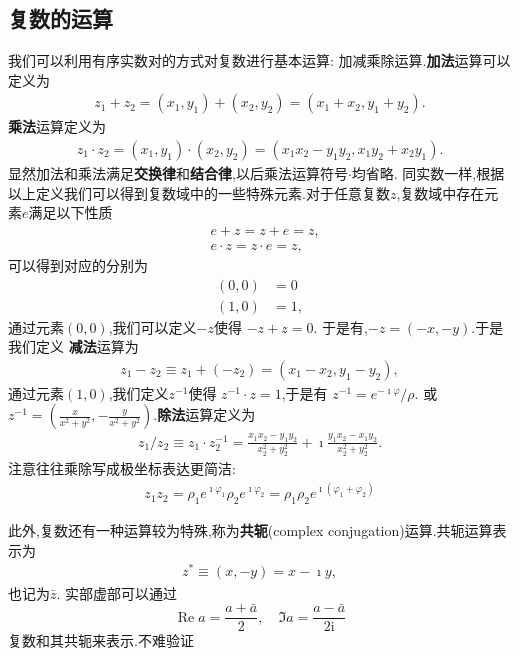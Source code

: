 \subsection{复数的运算}
我们可以利用有序实数对的方式对复数进行基本运算: 加减乘除运算.{\bf 加法}运算可以定义为
\begin{align}
    z_1 + z_2 = (x_1, y_1) + (x_2, y_2) = (x_1 + x_2, y_1 + y_2) .
\end{align}
{\bf 乘法}运算定义为
\begin{align}
    z_1 \cdot z_2 = (x_1, y_1) \cdot (x_2, y_2) = (x_1 x_2 - y_1 y_2, x_1 y_2 + x_2 y_1) .
\end{align}
显然加法和乘法满足{\bf 交换律}和{\bf 结合律},以后乘法运算符号$\cdot$均省略.
同实数一样,根据以上定义我们可以得到复数域中的一些特殊元素.对于任意复数$z$,复数域中存在元素$e$满足以下性质
\begin{align}
    & e + z = z + e = z ,\\ 
    & e \cdot z = z \cdot e = z , 
\end{align}
可以得到对应的分别为
\begin{align}
    (0, 0) &= 0\\
    (1, 0) &= 1 ,
\end{align}
通过元素$(0,0)$,我们可以定义$-z$使得 $-z + z = 0$. 于是有,$- z = (-x, -y)$.于是我们定义
{\bf 减法}运算为 
\begin{align}
    z_1 - z_2 \equiv z_1 + (-z_2) = (x_1 - x_2, y_1 - y_2) ,
\end{align}
通过元素$(1,0)$,我们定义$z^{-1}$使得
$z^{-1} \cdot z = 1$,于是有 $z^{-1} =e^{-\imath \varphi}/\rho  $.
或$z^{-1} = (\frac{x}{x^2 + y^2}, -\frac{y}{x^2 + y^2})$.{\bf 除法}运算定义为
\begin{align}
    z_1 / z_2 \equiv z_1 \cdot z_2^{-1} = \frac{x_1 x_2 - y_1 y_2} {x_2^2  +  y_2^2 }  + \imath \frac{y_1 x_2 - x_1 y_2} {x_2^2  +  y_2^2 } . 
\end{align}
注意往往乘除写成极坐标表达更简洁:
\begin{align}
    z_1 z_2 = \rho_1 e^{\imath \varphi_1 } \rho_2 e^{\imath \varphi_2 } = \rho_1 \rho_2 e^{\imath (\varphi_1 + \varphi_2)}
\end{align}

此外,复数还有一种运算较为特殊,称为{\bf 共轭}(complex conjugation)运算.共轭运算表示为
\begin{align}
    z^{*} \equiv (x, -y) = x - \imath y ,
\end{align}
也记为$\bar{z}$.
实部虚部可以通过
\begin{equation}
    \operatorname{Re} a=\frac{a+\bar{a}}{2}, \quad \Im a=\frac{a-\bar{a}}{2 \mathrm{i}}
\end{equation}
复数和其共轭来表示.不难验证

